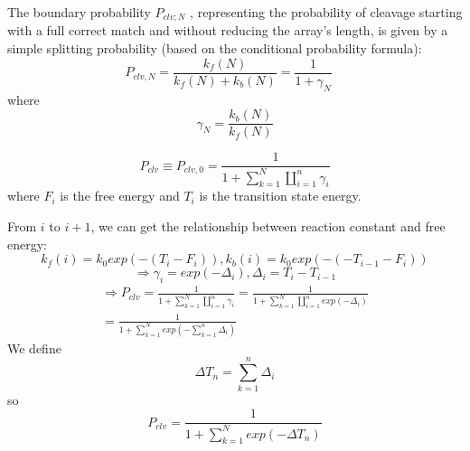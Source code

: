 The boundary probability $P_{clv;N}$ , representing the probability of cleavage starting with a full correct match and without reducing the array’s length, is given by a simple splitting probability (based on the conditional probability formula):
\begin{equation}
P_{clv,N}=\frac{k_f(N)}{k_f(N)+k_b(N)}=\frac{1}{1+\gamma_N} \quad
\end{equation}
where
\begin{equation}
 \gamma_N=\frac{k_b(N)}{k_f(N)}
\end{equation}
	
\begin{equation}
P_{clv} \equiv P_{clv,0} = \frac{1}{1+\sum_{k=1}^N\coprod_{i=1}^n \gamma_i}
\end{equation}
where $F_i$ is the free energy and $T_i$ is the transition state energy. 

From $i$ to $i+1$, we can get the relationship between reaction constant and free energy:
\begin{equation}
k_f(i)=k_0exp(-(T_i-F_i)),k_b(i)=k_0exp(-(-T_{i-1}-F_i))
\end{equation}
\begin{equation}
\Rightarrow \gamma_i=exp(-\Delta_i),\Delta_i=T_i-T_{i-1}
\end{equation}
\begin{equation}
\begin{aligned}
\Rightarrow P_{clv} = \frac{1}{1+\sum_{k=1}^N\coprod_{i=1}^n \gamma_i}=\frac{1}{1+\sum_{k=1}^N\coprod_{i=1}^n exp(-\Delta_i)}\\=\frac{1}{1+\sum_{k=1}^N exp(-\sum_{k=1}^n\Delta_i)}
\end{aligned}
\end{equation}
We define $$\Delta T_n=\sum_{k=1}^n\Delta_i$$
so
\begin{equation} 
P_{clv} =\frac{1}{1+\sum_{k=1}^N exp(-\Delta T_n)}
\end{equation}
	
